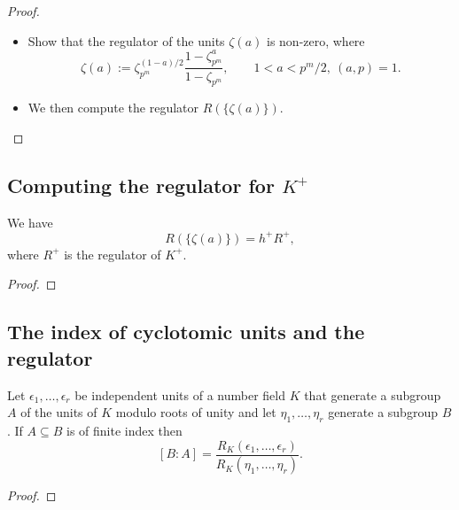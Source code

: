 \begin{proof}
    \begin{itemize}
        \item Show that the regulator of the units $\zeta(a)$ is non-zero, where 
        $$
        \zeta(a) := \zeta_{p^m}^{(1-a)/2} \frac{1 - \zeta_{p^m}^a}{1 - \zeta_{p^m}}, \qquad 1 < a < p^m / 2, \ (a, p) = 1.
        $$
        \item We then compute the regulator $R(\{\zeta(a)\})$. 
    \end{itemize}
\end{proof}

\subsection{Computing the regulator for $K^+$}

\begin{lem}\label{lem:regRa}
    We have 
    $$
    R(\{\zeta(a)\}) = h^+ R^+, 
    $$
    where $R^+$ is the regulator of $K^+$.
\end{lem}

\begin{proof}
\end{proof}

\subsection{The index of cyclotomic units and the regulator}

\begin{lem}\label{lem:index-reg}
Let $\epsilon_1, \dots, \epsilon_r$ be independent units of a number field $K$ that generate a subgroup 
$A$ of the units of $K$ modulo roots of unity and let $\eta_1, \dots, \eta_r$ generate a subgroup 
$B$. If $A \subseteq B$ is of finite index then 
$$
[B : A] = \frac{R_K(\epsilon_1, \dots, \epsilon_r)}{R_K(\eta_1, \dots, \eta_r)}.
$$
\end{lem}

\begin{proof}
\end{proof}